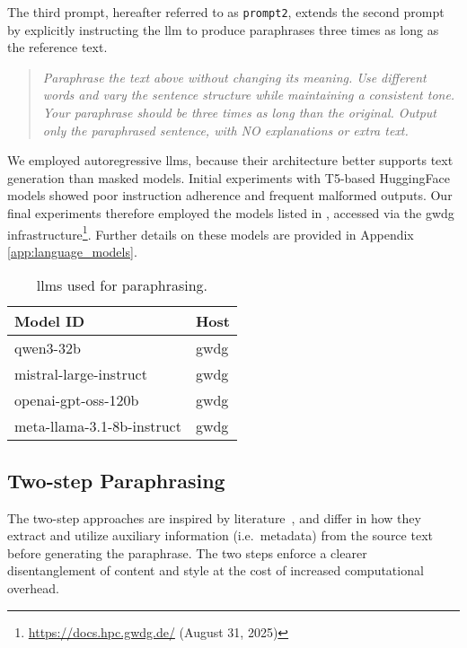 The third prompt, hereafter referred to as \texttt{prompt2}, extends the second prompt by explicitly instructing the \ac{llm} to produce paraphrases three times as long as the reference text.
\begin{quote}
  \textit{Paraphrase the text above without changing its meaning. Use different words and vary the sentence structure while maintaining a consistent tone. Your paraphrase should be three times as long than the original. Output only the paraphrased sentence, with NO explanations or extra text.}
\end{quote}

We employed autoregressive \acp{llm}, because their architecture better supports text generation than masked models.
Initial experiments with T5-based HuggingFace models showed poor instruction adherence and frequent malformed outputs. 
Our final experiments therefore employed the models listed in , accessed via the \ac{gwdg} infrastructure\footnote{\url{https://docs.hpc.gwdg.de/} (August 31, 2025)}.
Further details on these models are provided in Appendix \ref{app:language_models}.

\begin{table}[h]
\centering
\caption[\acp{llm} used for paraphrasing]{\acp{llm} used for paraphrasing.}
\label{tab:base_llms}
\begin{tabular}{@{}ll@{}}
\toprule
\textbf{Model ID}                    & \textbf{Host} \\
\midrule
qwen3-32b                            & \ac{gwdg}    \\
mistral-large-instruct               & \ac{gwdg}    \\
openai-gpt-oss-120b                  & \ac{gwdg}    \\
meta-llama-3.1-8b-instruct           & \ac{gwdg}    \\
\bottomrule   
\end{tabular}%
\end{table}


\subsection{Two-step Paraphrasing}

The two-step approaches are inspired by literature~\citep{bevendorff_overview_2024, ayele_overview_2024}, and differ in how they extract and utilize auxiliary information (i.e.\ metadata) from the source text before generating the paraphrase. 
The two steps enforce a clearer disentanglement of content and style at the cost of increased computational overhead.

